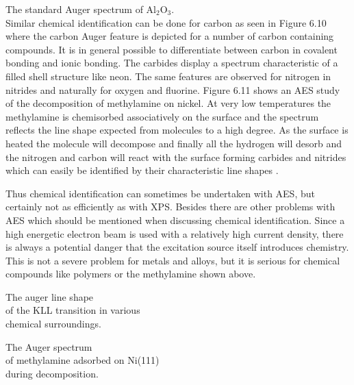            \vspace*{10cm}

           The standard  Auger  spectrum  of
          Al$_{2}$O$_{3}$.\\


Similar chemical identification can be done for carbon as seen in Figure 6.10 where the carbon Auger feature is depicted for a number of carbon containing compounds. It is in general possible to differentiate between carbon in covalent bonding and ionic bonding. The carbides display a spectrum characteristic of a filled shell structure like neon. The same features are observed for nitrogen in nitrides and naturally for oxygen and fluorine. Figure 6.11 shows an AES study of the decomposition of methylamine on nickel. At very low temperatures the methylamine is chemisorbed associatively on the surface and the spectrum reflects the line shape expected from molecules to a high degree. As the surface is heated the molecule will decompose and finally all the hydrogen will desorb and the nitrogen and carbon will react with the surface forming carbides and nitrides which can easily be identified by their characteristic line shapes \cite{chorkendorff3}.

Thus chemical identification can sometimes be undertaken with AES, but certainly not as efficiently as with XPS. Besides there are other problems with AES  which should be mentioned when discussing chemical identification. Since a high energetic electron beam is used with a relatively high current density, there is always a potential danger that the excitation source itself introduces chemistry. This is not a severe problem for metals and alloys, but it is serious for chemical compounds like polymers or the methylamine shown above.

             \newpage {} The auger line
          shape\\ of the KLL transition in various\\ chemical
          surroundings. 

                                 \vspace{9cm}

               The  Auger  spectrum \\  of
          methylamine adsorbed on Ni(111)\\ during decomposition.

                                           \newpage

